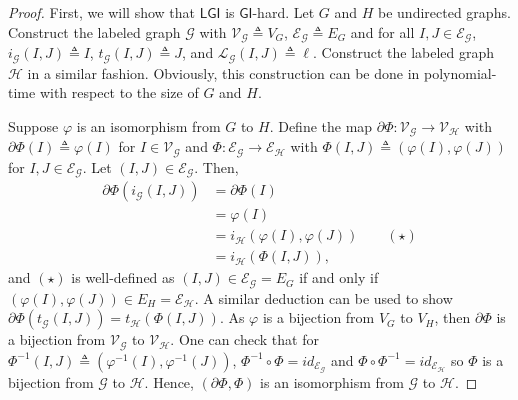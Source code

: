 \documentclass[hidelinks]{article}
\newcommand{\Lc}{\mathcal{L}}  %
\newcommand{\Gc}{\mathcal{G}}  %
\newcommand{\Hc}{\mathcal{H}}  %
\newcommand{\Vc}{\mathcal{V}}
\newcommand{\Ec}{\mathcal{E}}
\newcommand{\GI}{\textsf{GI}}
\newcommand{\LGI}{\textsf{LGI}}
\theoremstyle{definition}
\begin{document}
\begin{proof}
    

    First, we will show that \(\LGI\) is \(\GI\)-hard. Let 
    \(G\) and \(H\) be undirected graphs. Construct the labeled graph \(\Gc\) 
    with \(\Vc_\Gc \triangleq V_G\), \(\Ec_\Gc \triangleq E_G\) and for all \(I, J \in \Ec_\Gc\),
    \(i_\Gc(I, J) \triangleq I\), \(t_\Gc(I, J) \triangleq J\), and \(\Lc_\Gc(I, J) \triangleq \ell\). 
    Construct the labeled graph \(\Hc\) in a similar fashion. Obviously, this construction can be done in polynomial-time with respect 
    to the size of \(G\) and \(H\).

    Suppose \(\varphi\) is an isomorphism from \(G\) to \(H\). Define the map 
    \(\partial\Phi : \Vc_\Gc \to \Vc_\Hc\) with \(\partial\Phi(I) \triangleq \varphi(I)\) for \(I \in \Vc_\Gc\) 
    and \(\Phi : \Ec_\Gc \to \Ec_\Hc\) with \(\Phi(I, J) \triangleq (\varphi(I), \varphi(J))\)
    for \(I, J \in \Ec_\Gc\).
    Let \((I, J) \in \Ec_\Gc\). Then, 
    \begin{align*}
        \partial\Phi(i_\Gc(I, J)) &= \partial\Phi(I) \\ 
        &= \varphi(I) \\
        &= i_\Hc(\varphi(I), \varphi(J)) \qquad (\star)\\ 
        &= i_\Hc(\Phi(I, J)),
    \end{align*}
    and \((\star)\) is well-defined as \((I, J) \in \Ec_\Gc = E_G\) if and only if \((\varphi(I), \varphi(J)) \in E_H = \Ec_\Hc\).
    A similar deduction can be used to show \(\partial\Phi(t_\Gc(I, J)) = t_\Hc(\Phi(I, J))\). 
    As \(\varphi\) is a bijection from \(V_G\) to \(V_H\), then \(\partial\Phi\) is a 
    bijection from \(\Vc_\Gc\) to \(\Vc_\Hc\). One can check that for \(\Phi^{-1}(I, J) \triangleq (\varphi^{-1}(I), \varphi^{-1}(J))\),
    \(\Phi^{-1} \circ \Phi = id_{\Ec_\Gc}\) and \(\Phi \circ \Phi^{-1} = id_{\Ec_\Hc}\) 
    so \(\Phi\) is a bijection from \(\Gc\) to \(\Hc\). Hence, \((\partial\Phi, \Phi)\) is an 
    isomorphism from \(\Gc\) to \(\Hc\).


\end{proof}
\end{document}
